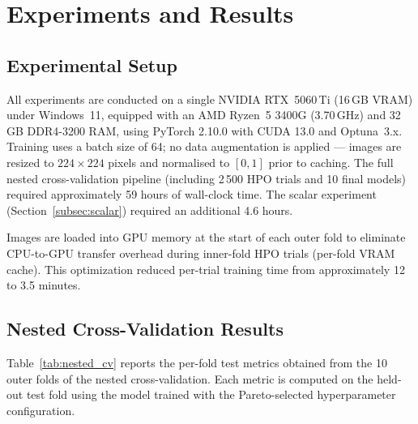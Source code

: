 
\section{Experiments and Results}
\label{sec:experiments}

\subsection{Experimental Setup}
\label{subsec:setup}

All experiments are conducted on a single NVIDIA RTX~5060\,Ti (16\,GB VRAM) under
Windows~11, equipped with an AMD Ryzen~5 3400G (3.70\,GHz) and 32\,GB DDR4-3200 RAM,
using PyTorch 2.10.0 with CUDA 13.0 and Optuna~3.x. Training uses a batch size of
64; no data augmentation is applied --- images are resized to $224\!\times\!224$
pixels and normalised to $[0,1]$ prior to caching. The full nested cross-validation
pipeline (including 2\,500 HPO trials and 10 final models) required approximately
59 hours of wall-clock time. The scalar experiment
(Section~\ref{subsec:scalar}) required an additional 4.6 hours.

Images are loaded into GPU memory at the start of each outer fold to eliminate
CPU-to-GPU transfer overhead during inner-fold HPO trials (per-fold VRAM cache).
This optimization reduced per-trial training time from approximately 12 to 3.5 minutes.

\subsection{Nested Cross-Validation Results}
\label{subsec:ncv_results}

Table~\ref{tab:nested_cv} reports the per-fold test metrics obtained from the 10
outer folds of the nested cross-validation. Each metric is computed on the held-out
test fold using the model trained with the Pareto-selected hyperparameter
configuration.

